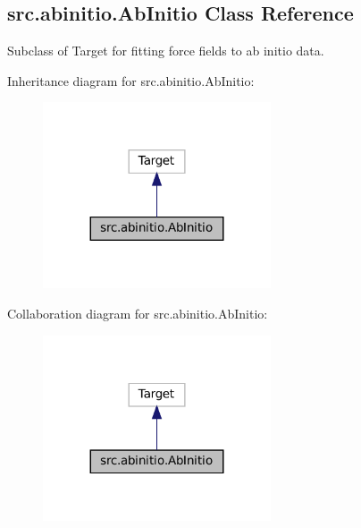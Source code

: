 \hypertarget{classsrc_1_1abinitio_1_1AbInitio}{}\subsection{src.\+abinitio.\+Ab\+Initio Class Reference}
\label{classsrc_1_1abinitio_1_1AbInitio}


Subclass of Target for fitting force fields to ab initio data.  




Inheritance diagram for src.\+abinitio.\+Ab\+Initio\+:
\nopagebreak
\begin{figure}[H]
\begin{center}
\leavevmode
\includegraphics[width=191pt]{classsrc_1_1abinitio_1_1AbInitio__inherit__graph}
\end{center}
\end{figure}


Collaboration diagram for src.\+abinitio.\+Ab\+Initio\+:
\nopagebreak
\begin{figure}[H]
\begin{center}
\leavevmode
\includegraphics[width=191pt]{classsrc_1_1abinitio_1_1AbInitio__coll__graph}
\end{center}
\end{figure}
